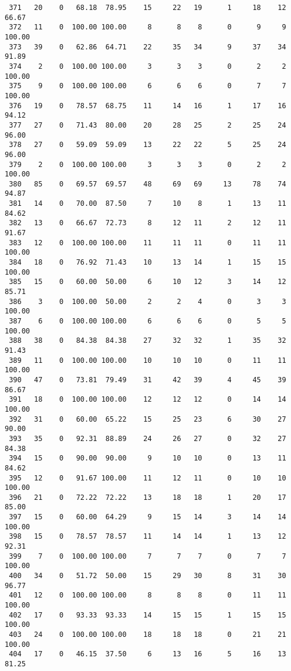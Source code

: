 \begin{verbatim}
 371   20    0   68.18  78.95    15     22   19      1     18    12    66.67
 372   11    0  100.00 100.00     8      8    8      0      9     9   100.00
 373   39    0   62.86  64.71    22     35   34      9     37    34    91.89
 374    2    0  100.00 100.00     3      3    3      0      2     2   100.00
 375    9    0  100.00 100.00     6      6    6      0      7     7   100.00
 376   19    0   78.57  68.75    11     14   16      1     17    16    94.12
 377   27    0   71.43  80.00    20     28   25      2     25    24    96.00
 378   27    0   59.09  59.09    13     22   22      5     25    24    96.00
 379    2    0  100.00 100.00     3      3    3      0      2     2   100.00
 380   85    0   69.57  69.57    48     69   69     13     78    74    94.87
 381   14    0   70.00  87.50     7     10    8      1     13    11    84.62
 382   13    0   66.67  72.73     8     12   11      2     12    11    91.67
 383   12    0  100.00 100.00    11     11   11      0     11    11   100.00
 384   18    0   76.92  71.43    10     13   14      1     15    15   100.00
 385   15    0   60.00  50.00     6     10   12      3     14    12    85.71
 386    3    0  100.00  50.00     2      2    4      0      3     3   100.00
 387    6    0  100.00 100.00     6      6    6      0      5     5   100.00
 388   38    0   84.38  84.38    27     32   32      1     35    32    91.43
 389   11    0  100.00 100.00    10     10   10      0     11    11   100.00
 390   47    0   73.81  79.49    31     42   39      4     45    39    86.67
 391   18    0  100.00 100.00    12     12   12      0     14    14   100.00
 392   31    0   60.00  65.22    15     25   23      6     30    27    90.00
 393   35    0   92.31  88.89    24     26   27      0     32    27    84.38
 394   15    0   90.00  90.00     9     10   10      0     13    11    84.62
 395   12    0   91.67 100.00    11     12   11      0     10    10   100.00
 396   21    0   72.22  72.22    13     18   18      1     20    17    85.00
 397   15    0   60.00  64.29     9     15   14      3     14    14   100.00
 398   15    0   78.57  78.57    11     14   14      1     13    12    92.31
 399    7    0  100.00 100.00     7      7    7      0      7     7   100.00
 400   34    0   51.72  50.00    15     29   30      8     31    30    96.77
 401   12    0  100.00 100.00     8      8    8      0     11    11   100.00
 402   17    0   93.33  93.33    14     15   15      1     15    15   100.00
 403   24    0  100.00 100.00    18     18   18      0     21    21   100.00
 404   17    0   46.15  37.50     6     13   16      5     16    13    81.25

\end{verbatim}
